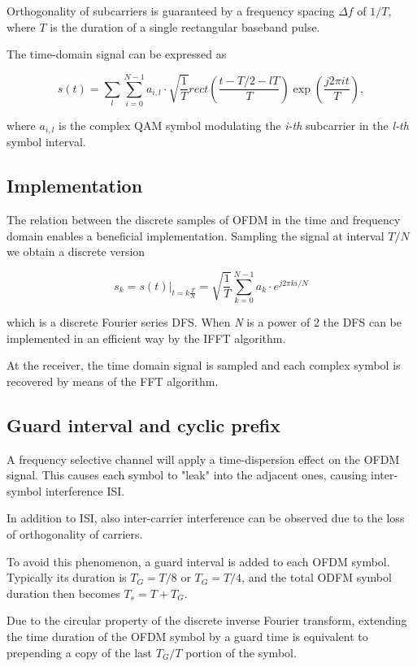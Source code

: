 Orthogonality of subcarriers is guaranteed by a frequency spacing $\Delta f$ of $1/T$, where $T$ is the duration of a single rectangular baseband pulse.

The time-domain signal can be expressed as

\begin{equation}
    s(t) = \sum_l\sum_{i=0}^{N-1} a_{i,l}\cdot \sqrt{\frac{1}{T}} rect \left( \frac{t-T/2 - lT}{T} \right)\exp{\left(\frac{j2\pi it}{T}\right)},
\end{equation}

where $a_{i,l}$ is the complex QAM symbol modulating the \textit{i-th} subcarrier in the \textit{l-th} symbol interval.

\subsection{Implementation}
The relation between the discrete samples of OFDM in the time and frequency domain enables a beneficial implementation.
Sampling the signal at interval $T/N$ we obtain a discrete version

\begin{equation}
    s_k = s(t)|_{t=k \frac{T}{N}} = \sqrt{\frac{1}{T}}\sum_{k=0}^{N-1} a_k \cdot e^{j2\pi ki/N}
\end{equation}

which is a discrete Fourier series DFS. When \textit{N} is a power of 2 the DFS can be implemented in an efficient way by the IFFT algorithm.

At the receiver, the time domain signal is sampled and each complex symbol is recovered by means of the FFT algorithm.

\subsection{Guard interval and cyclic prefix}
A frequency selective channel will apply a time-dispersion effect on the OFDM signal. This causes each symbol to "leak" into the adjacent ones, causing inter-symbol interference ISI.

In addition to ISI, also inter-carrier interference can be observed due to the loss of orthogonality of carriers.

To avoid this phenomenon, a guard interval is added to each OFDM symbol. Typically its duration is $T_G = T/8$ or $T_G = T/4$, and the total ODFM symbol duration then becomes $T_s = T + T_G$.

Due to the circular property of the discrete inverse Fourier transform, extending the time duration of the OFDM symbol by a guard time is equivalent to prepending a copy of the last $T_G/T$ portion of the symbol.

